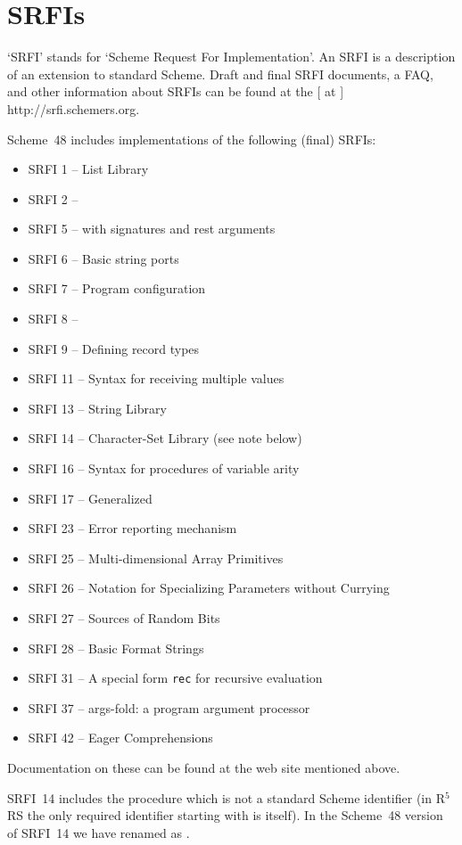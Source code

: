 \section{SRFIs}

`SRFI' stands for `Scheme Request For Implementation'.
An SRFI is a description of an extension to standard Scheme.
Draft and final SRFI documents, a FAQ, and other information about SRFIs
 can be found at the
[ at ]
{http://srfi.schemers.org}.

Scheme~48 includes implementations of the following (final) SRFIs:
\begin{itemize}
\item SRFI 1 -- List Library
\item SRFI 2 -- 
\item SRFI 5 --  with signatures and rest arguments
\item SRFI 6 -- Basic string ports
\item SRFI 7 -- Program configuration
\item SRFI 8 -- 
\item SRFI 9 -- Defining record types
\item SRFI 11 -- Syntax for receiving multiple values 
\item SRFI 13 -- String Library
\item SRFI 14 -- Character-Set Library (see note below)
\item SRFI 16 -- Syntax for procedures of variable arity
\item SRFI 17 -- Generalized 
\item SRFI 23 -- Error reporting mechanism
\item SRFI 25 -- Multi-dimensional Array Primitives 
\item SRFI 26 -- Notation for Specializing Parameters without Currying
\item SRFI 27 -- Sources of Random Bits
\item SRFI 28 -- Basic Format Strings
\item SRFI 31 -- A special form \texttt{rec} for recursive evaluation
\item SRFI 37 -- args-fold: a program argument processor
\item SRFI 42 -- Eager Comprehensions
\end{itemize}
Documentation on these can be found at the web site mentioned above.

SRFI~14 includes the procedure  which is not a standard
 Scheme identifier (in R$^5$RS the only required identifier starting
 with \code{-} is \code{-} itself).
In the Scheme~48 version of SRFI~14 we have renamed 
 as .

